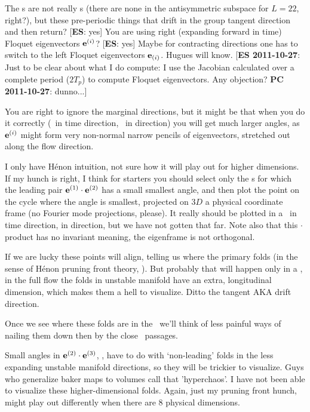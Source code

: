 \begin{description}
  The \po s are not really \po s (there are none in the
  antisymmetric subspace for $L=22$, right?), but these pre-periodic
  things that drift in the group tangent direction and then return? [{\bf ES}: yes]
  You are using right (expanding forward in time) Floquet eigenvectors
  $\jEigvec[i]$? [{\bf ES}: yes] Maybe for contracting directions one has to switch to the
  left Floquet eigenvectors $\jEigvecT[i]$. Hugues will know.
  [{\bf ES 2011-10-27}: Just to be clear about what I do compute: I use the Jacobian
  calculated over a complete period ($2T_p$) to compute Floquet eigenvectors.
  Any objection? {\bf PC 2011-10-27}: dunno...]

  You are right to ignore the marginal directions, but it might be that
  when you do it correctly (\Poincare\ in time direction, \slice\ in 
  direction) you will get much larger angles, as $\jEigvec[i]$ might form
  very non-normal narrow pencils of eigenvectors, stretched out along the
  flow direction.

  I only have H\'enon intuition, not sure how it will play out for higher
  dimensions. If my hunch is right, I think for starters you should select
  only the \po s for which the leading pair $\jEigvec[1] \cdot \jEigvec[2]$
  has a small smallest angle, and then plot the point on the cycle where
  the angle is smallest, projected on $3D$ a physical coordinate
  frame (no Fourier mode projections, please). It really
  should be plotted in a \Poincare\ in time direction, \slice in 
  direction, but we have not gotten that far. Note also that this $\cdot$
  product has no invariant meaning, the eigenframe is not orthogonal.

  If we are lucky these points
  will align, telling us where the primary folds (in the sense of H\'enon
  pruning front theory, ). But probably that will happen
  only in a {\PoincSec}, in the full flow the folds in unstable
  manifold have an extra, longitudinal dimension, which makes them a hell
  to visualize. Ditto the  tangent AKA drift direction.

  Once we see where these folds are in the \statesp\ we'll think of less
  painful ways of nailing them down then by the close \po\ passages.

  Small angles in $\jEigvec[2] \cdot \jEigvec[3]$, \etc, have to do with
  `non-leading' folds in the less expanding unstable manifold directions,
  so they will be trickier to visualize. Guys who generalize baker maps to
  volumes call that 'hyperchaos'. I have not been able to visualize these
  higher-dimensional folds. Again, just my pruning front hunch, might play
  out differently when there are 8 physical dimensions.


\end{description}
